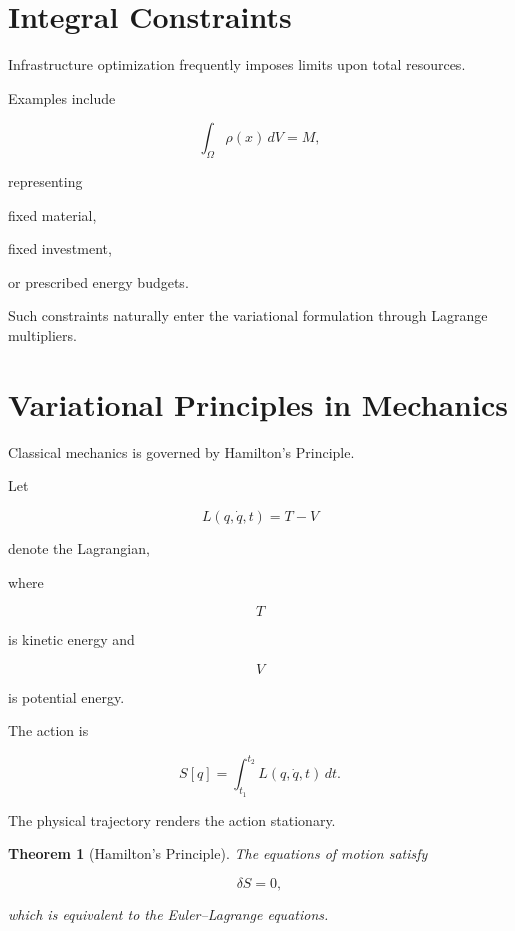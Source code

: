 \documentclass[11pt,fleqn]{book}
\numberwithin{equation}{chapter}
\theoremstyle{plain}
\newtheorem{theorem}{Theorem}[chapter]
\theoremstyle{definition}
\theoremstyle{remark}
\begin{document}

\section{Integral Constraints}

Infrastructure optimization frequently imposes limits upon total
resources.

Examples include

\[
\int_\Omega
\rho(x)
\,dV
=
M,
\]

representing

fixed material,

fixed investment,

or prescribed energy budgets.

Such constraints naturally enter the variational formulation through
Lagrange multipliers.


\section{Variational Principles in Mechanics}

Classical mechanics is governed by Hamilton's Principle.

Let

\[
L(q,\dot q,t)
=
T-V
\]

denote the Lagrangian,

where

\[
T
\]

is kinetic energy and

\[
V
\]

is potential energy.

The action is

\[
\boxed{
S[q]
=
\int_{t_1}^{t_2}
L(q,\dot q,t)
\,dt.
}
\]

The physical trajectory renders the action stationary.


\begin{theorem}[Hamilton's Principle]

The equations of motion satisfy

\[
\boxed{
\delta S
=
0,
}
\]

which is equivalent to the Euler--Lagrange equations.

\end{theorem}
\end{document}
